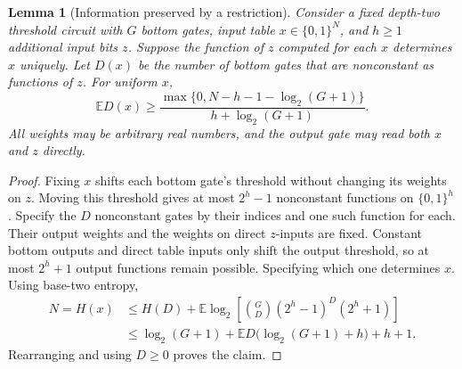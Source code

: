 \documentclass[11pt]{article}
\newtheorem{lemma}[theorem]{Lemma}
\newcommand{\bits}{\{0,1\}}
\begin{document}
\begin{lemma}[Information preserved by a restriction]\label{lem:entropy}
Consider a fixed depth-two threshold circuit with $G$ bottom gates, input
table $x\in\bits^N$, and $h\ge1$ additional input bits $z$. Suppose the
function of $z$ computed for each $x$ determines $x$ uniquely. Let $D(x)$
be the number of bottom gates that are nonconstant as functions of $z$.
For uniform $x$,
$$
\mathbb E D(x)\ge
\frac{\max\{0,N-h-1-\log_2(G+1)\}}{h+\log_2(G+1)}.
$$
All weights may be arbitrary real numbers, and the output gate may read
both $x$ and $z$ directly.
\end{lemma}
\begin{proof}
Fixing $x$ shifts each bottom gate's threshold without changing its
weights on $z$. Moving this threshold gives at most $2^h-1$ nonconstant
functions on $\bits^h$. Specify the $D$ nonconstant gates by their
indices and one such function for each. Their output weights and the
weights on direct $z$-inputs are fixed. Constant bottom outputs and
direct table inputs only shift the output threshold, so at most $2^h+1$
output functions remain possible. Specifying which one determines $x$.
Using base-two entropy,
\begin{align*}
N=H(x)&\le H(D)+\mathbb E\log_2\left[
 \binom GD(2^h-1)^D(2^h+1)\right]\\
&\le\log_2(G+1)+\mathbb E D\bigl(\log_2(G+1)+h\bigr)+h+1.
\end{align*}
Rearranging and using $D\ge0$ proves the claim.
\end{proof}
\end{document}
